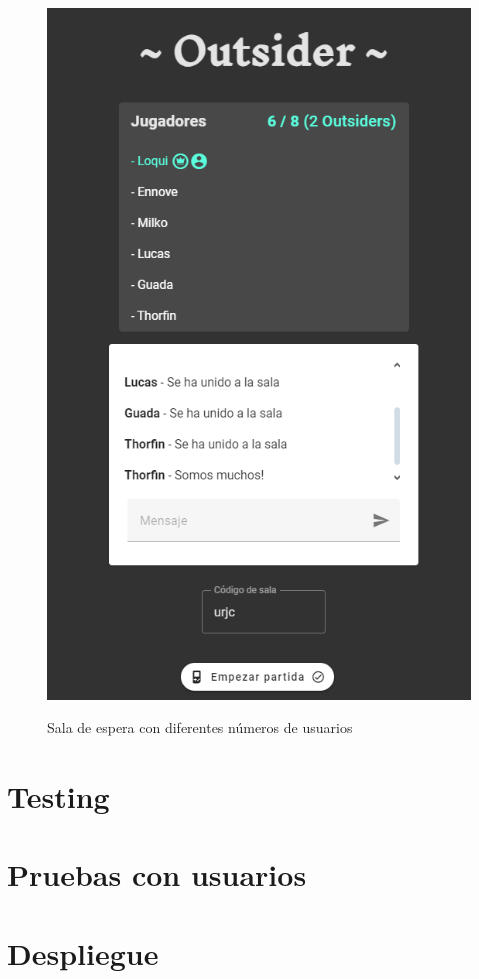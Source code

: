 \begin{figure}[h]
\begin{minipage}{0.45\textwidth}
	  \includegraphics[clip=true,width=\textwidth]{res_lobby1.png}\\
   \end{minipage}
   \caption{Sala de espera con diferentes números de usuarios}
   \label{fig:res_lobby}
 \end{figure}

\section{Testing}

\section{Pruebas con usuarios}

\section{Despliegue}





